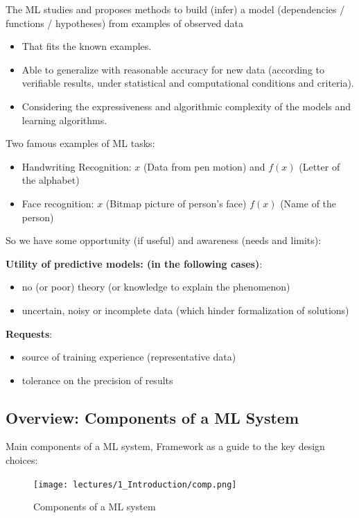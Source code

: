 \documentclass[../main.tex]{subfiles}
\begin{document}
The ML studies and proposes methods to build (infer) a model (dependencies / functions / hypotheses) from examples of observed data
\begin{itemize}
    \item That fits the known examples.
    \item Able to generalize with reasonable accuracy for new data (according to verifiable results, under statistical and computational conditions and criteria).
    \item Considering the expressiveness and algorithmic complexity of the models and learning algorithms.
\end{itemize}
\begin{example}
Two famous examples of ML tasks:
\begin{itemize}
    \item Handwriting Recognition: $x$ (Data from pen motion) and $f(x)$ (Letter of the alphabet)
    \item Face recognition: $x$ (Bitmap picture of person's face) $f(x)$ (Name of the person)
\end{itemize}   
\end{example}

So we have some opportunity (if useful) and awareness (needs and limits):

\textbf{Utility of predictive models: (in the following cases)}:
\begin{itemize}
    \item no (or poor) theory (or knowledge to explain the phenomenon)
    \item uncertain, noisy or incomplete data (which hinder formalization of solutions)
\end{itemize}

\textbf{Requests}:
\begin{itemize}
    \item source of training experience (representative data)
    \item tolerance on the precision of results
\end{itemize}

\subsection{Overview: Components of a ML System}
Main components of a ML system, Framework as a guide to the key design choices:
 
\begin{figure}[ht!]
\centering
\texttt{[image: lectures/1\_Introduction/comp.png]}
\caption{Components of a ML system}
\label{fig:MLComponents}
\end{figure}
\end{document}
